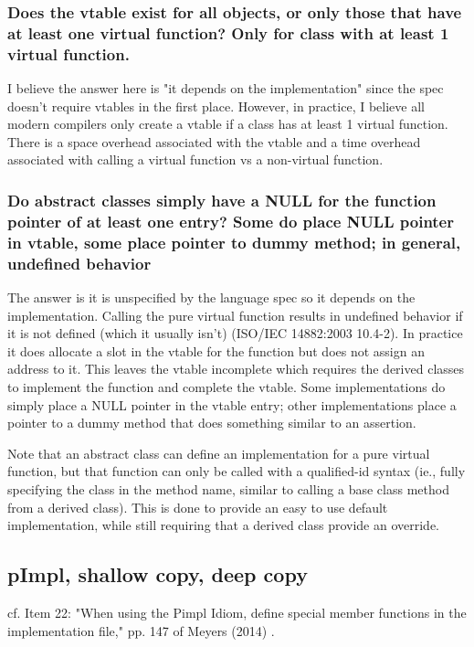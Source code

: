 \documentclass[10pt]{amsart}
\begin{document}
\begin{multicols*}{2}
\subsubsection{Does the vtable exist for all objects, or only those that have at least one virtual function?  Only for class with at least 1 virtual function.}  

I believe the answer here is "it depends on the implementation" since the spec doesn't require vtables in the first place. However, in practice, I believe all modern compilers only create a vtable if a class has at least 1 virtual function. There is a space overhead associated with the vtable and a time overhead associated with calling a virtual function vs a non-virtual function.

\subsubsection{Do abstract classes simply have a NULL for the function pointer of at least one entry?  Some do place NULL pointer in vtable, some place pointer to dummy method; in general, undefined behavior}

The answer is it is unspecified by the language spec so it depends on the implementation. Calling the pure virtual function results in undefined behavior if it is not defined (which it usually isn't) (ISO/IEC 14882:2003 10.4-2). In practice it does allocate a slot in the vtable for the function but does not assign an address to it. This leaves the vtable incomplete which requires the derived classes to implement the function and complete the vtable. Some implementations do simply place a NULL pointer in the vtable entry; other implementations place a pointer to a dummy method that does something similar to an assertion.

Note that an abstract class can define an implementation for a pure virtual function, but that function can only be called with a qualified-id syntax (ie., fully specifying the class in the method name, similar to calling a base class method from a derived class). This is done to provide an easy to use default implementation, while still requiring that a derived class provide an override.

\subsection{pImpl, shallow copy, deep copy}  

cf. Item 22: "When using the Pimpl Idiom, define special member functions in the implementation file," pp. 147 of Meyers (2014) \cite{ScMe2014}.  


\end{multicols*}
\end{document}
